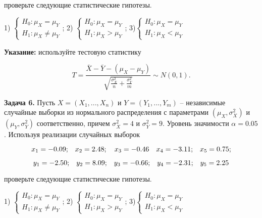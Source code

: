 проверьте следующие статистические гипотезы.

1) $\left\{\begin{array}{l} {H_{0} :\mu _{X} =\mu _{Y} } \\ {H_{1} :\mu _{X} \ne \mu _{Y} } \end{array}\right. $;             2) $\left\{\begin{array}{l} {H_{0} :\mu _{X} =\mu _{Y} } \\ {H_{1} :\mu _{X} >\mu _{Y} } \end{array}\right. $;             3)$\left\{\begin{array}{l} {H_{0} :\mu _{X} =\mu _{Y} } \\ {H_{1} :\mu _{X} <\mu _{Y} } \end{array}\right. $

\textbf{Указание:} используйте тестовую статистику

\[T=\frac{\bar{X}-\bar{Y}-(\mu _{X} -\mu _{Y} )}{\sqrt{{\tfrac{\sigma _{X}^{2} }{n}} +{\tfrac{\sigma _{Y}^{2} }{m}} } } \sim N(0,1).\] 

\textbf{Задача 6.} Пусть $X=\left(X_{1} ,...,X_{n} \right)$ и $Y=\left(Y_{1} ,...,Y_{m} \right)$ -- независимые случайные выборки из нормального распределения с параметрами $\left(\mu _{X} ,\sigma _{X}^{2} \right)$ и $\left(\mu _{Y} ,\sigma _{Y}^{2} \right)$ соответственно, причем $\sigma _{X}^{2} =4$ и $\sigma _{Y}^{2} =9$. Уровень значимости $\alpha =0.05$. Используя реализации случайных выборок 

\[x_{1} =-0.0{\rm 9;}\quad x_{2} ={\rm 2.48};\quad x_{3} =-0.{\rm 46}\quad x_{4} =-{\rm 3.11;}\quad x_{5} =0.{\rm 75;}\] 

\[y_{1} =-{\rm 2.5}0{\rm ;}\quad y_{2} ={\rm 8.}0{\rm 9;}\quad y_{3} =-0.{\rm 66;}\quad y_{4} =-{\rm 2.31;}\quad y_{5} ={\rm 2.25}\] 

проверьте следующие статистические гипотезы.

1) $\left\{\begin{array}{l} {H_{0} :\mu _{X} =\mu _{Y} } \\ {H_{1} :\mu _{X} \ne \mu _{Y} } \end{array}\right. $;             2) $\left\{\begin{array}{l} {H_{0} :\mu _{X} =\mu _{Y} } \\ {H_{1} :\mu _{X} >\mu _{Y} } \end{array}\right. $;             3)$\left\{\begin{array}{l} {H_{0} :\mu _{X} =\mu _{Y} } \\ {H_{1} :\mu _{X} <\mu _{Y} } \end{array}\right. $





